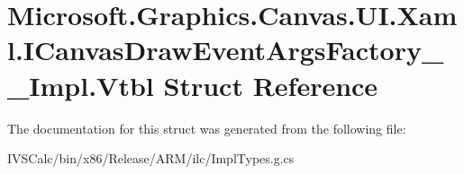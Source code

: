 \hypertarget{struct_microsoft_1_1_graphics_1_1_canvas_1_1_u_i_1_1_xaml_1_1_i_canvas_draw_event_args_factory_____impl_1_1_vtbl}{}\section{Microsoft.\+Graphics.\+Canvas.\+U\+I.\+Xaml.\+I\+Canvas\+Draw\+Event\+Args\+Factory\+\_\+\+\_\+\+Impl.\+Vtbl Struct Reference}
\label{struct_microsoft_1_1_graphics_1_1_canvas_1_1_u_i_1_1_xaml_1_1_i_canvas_draw_event_args_factory_____impl_1_1_vtbl}


The documentation for this struct was generated from the following file\+:\begin{DoxyCompactItemize}
\item 
I\+V\+S\+Calc/bin/x86/\+Release/\+A\+R\+M/ilc/Impl\+Types.\+g.\+cs\end{DoxyCompactItemize}
